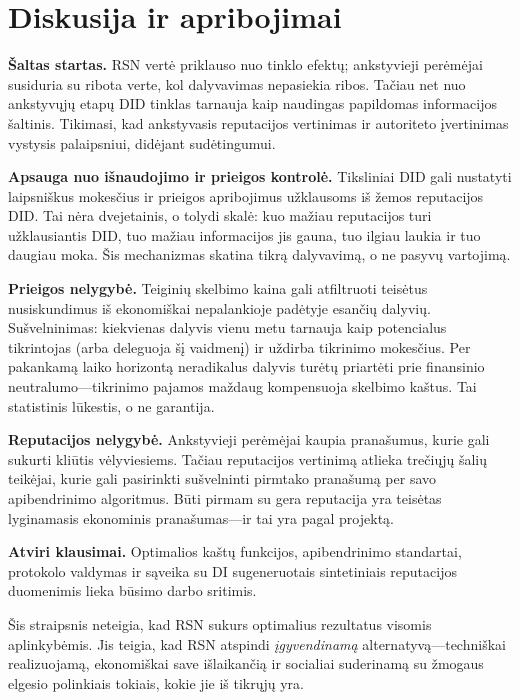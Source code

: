 \documentclass[11pt,a4paper,twocolumn]{article}
\begin{document}
\section{Diskusija ir apribojimai}

\textbf{Šaltas startas.} RSN vertė priklauso nuo tinklo efektų; ankstyvieji perėmėjai susiduria su ribota verte, kol dalyvavimas nepasiekia ribos. Tačiau net nuo ankstyvųjų etapų DID tinklas tarnauja kaip naudingas papildomas informacijos šaltinis. Tikimasi, kad ankstyvasis reputacijos vertinimas ir autoriteto įvertinimas vystysis palaipsniui, didėjant sudėtingumui.

\textbf{Apsauga nuo išnaudojimo ir prieigos kontrolė.} Tiksliniai DID gali nustatyti laipsniškus mokesčius ir prieigos apribojimus užklausoms iš žemos reputacijos DID. Tai nėra dvejetainis, o tolydi skalė: kuo mažiau reputacijos turi užklausiantis DID, tuo mažiau informacijos jis gauna, tuo ilgiau laukia ir tuo daugiau moka. Šis mechanizmas skatina tikrą dalyvavimą, o ne pasyvų vartojimą.

\textbf{Prieigos nelygybė.} Teiginių skelbimo kaina gali atfiltruoti teisėtus nusiskundimus iš ekonomiškai nepalankioje padėtyje esančių dalyvių. Sušvelninimas: kiekvienas dalyvis vienu metu tarnauja kaip potencialus tikrintojas (arba deleguoja šį vaidmenį) ir uždirba tikrinimo mokesčius. Per pakankamą laiko horizontą neradikalus dalyvis turėtų priartėti prie finansinio neutralumo---tikrinimo pajamos maždaug kompensuoja skelbimo kaštus. Tai statistinis lūkestis, o ne garantija.

\textbf{Reputacijos nelygybė.} Ankstyvieji perėmėjai kaupia pranašumus, kurie gali sukurti kliūtis vėlyviesiems. Tačiau reputacijos vertinimą atlieka trečiųjų šalių teikėjai, kurie gali pasirinkti sušvelninti pirmtako pranašumą per savo apibendrinimo algoritmus. Būti pirmam su gera reputacija yra teisėtas lyginamasis ekonominis pranašumas---ir tai yra pagal projektą.

\textbf{Atviri klausimai.} Optimalios kaštų funkcijos, apibendrinimo standartai, protokolo valdymas ir sąveika su DI sugeneruotais sintetiniais reputacijos duomenimis lieka būsimo darbo sritimis.

Šis straipsnis neteigia, kad RSN sukurs optimalius rezultatus visomis aplinkybėmis. Jis teigia, kad RSN atspindi \emph{įgyvendinamą} alternatyvą---techniškai realizuojamą, ekonomiškai save išlaikančią ir socialiai suderinamą su žmogaus elgesio polinkiais tokiais, kokie jie iš tikrųjų yra.
\end{document}
